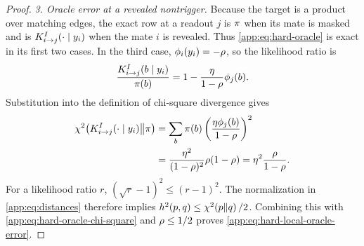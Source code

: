 \begin{proof}
\emph{3. Oracle error at a revealed nontrigger.}
Because the target is a product over matching edges, the exact row at a
readout \(j\) is \(\pi\) when its mate is masked and is
\(K_{i\to j}^{I}(\cdot\mid y_i)\) when the mate \(i\) is revealed.
Thus \eqref{app:eq:hard-oracle} is exact in its first two cases.  In the third
case, $\phi_{i}(y_i)=-\rho$, so the likelihood ratio is
\[
 \frac{K_{i\to j}^{I}(b\mid y_i)}{\pi(b)}
 =1-\frac{\eta}{1-\rho}\phi_{j}(b).
\]
Substitution into the definition of chi-square divergence gives
\begin{align}
 \chi^2\!\left(
  K_{i\to j}^{I}(\cdot\mid y_i)\middle\Vert \pi\right)
 &=\sum_b\pi(b)
       \left(\frac{\eta\phi_{j}(b)}
                   {1-\rho}\right)^2\notag\\
 &=\frac{\eta^2}{(1-\rho)^2}
       \rho(1-\rho)
 =\eta^2\frac{\rho}{1-\rho}.
 \label{app:eq:hard-oracle-chi-square}
\end{align}
For a likelihood ratio \(r\),
\((\sqrt r-1)^2\le(r-1)^2\).  The normalization in
\eqref{app:eq:distances} therefore implies
\(h^2(p,q)\le\chi^2\!\left(p\middle\Vert q\right)/2\).  Combining this with
\eqref{app:eq:hard-oracle-chi-square} and
\(\rho\le1/2\) proves \eqref{app:eq:hard-local-oracle-error}.



\end{proof}
